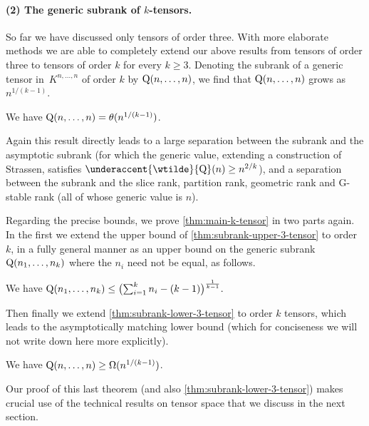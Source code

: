 \documentclass[10pt,a4paper]{article}
\theoremstyle{definition}
\theoremstyle{remark}
\newcommand{\gensubrank}{{\rm Q}}
\DeclareMathOperator{\asympsubrank}{\underaccent{\wtilde}{Q}}
\begin{document}
%

%

%
%
%
%
%
%
%
%
%
%

\paragraph{(2) The generic subrank of $k$-tensors.}
So far we have discussed only tensors of order three. With more elaborate methods we are able to completely extend our above results from tensors of order three to tensors of order $k$ for every $k \geq 3$. Denoting the subrank of a generic tensor in~$K^{n,\ldots, n}$ of order $k$ by $\gensubrank(n,\ldots,n)$, we find that $\gensubrank(n,\ldots,n)$ grows as~$n^{1/(k-1)}$.


\begin{theorem}\label{thm:main-k-tensor}
We have $\gensubrank(n,\ldots,n) = \theta(n^{1/(k-1)})$.
\end{theorem}


Again this result directly leads to a large separation between the subrank and the asymptotic subrank (for which the generic value, extending a construction of Strassen, satisfies $\asympsubrank(n) \geq n^{2/k}$), and a separation between the subrank and the slice rank, partition rank, geometric rank and G-stable rank (all of whose generic value is $n$).

Regarding the precise bounds, we prove \autoref{thm:main-k-tensor} in two parts again. 
In the first we extend the upper bound of \autoref{thm:subrank-upper-3-tensor}
to order $k$, in a fully general manner as an upper bound on the generic subrank $\gensubrank(n_1,\ldots,n_k)$ where the $n_i$ need not be equal, as follows.

\begin{theorem} \label{thm:subrank-upper-k-tensor}
%
We have
$
\gensubrank(n_1,\ldots,n_k) \leq \bigl(\sum_{i=1}^k n_i - (k-1)\bigr)^{\frac{1}{k-1}}.
$
\end{theorem}

Then finally we extend \autoref{thm:subrank-lower-3-tensor} to order $k$ tensors, which leads to the asymptotically matching lower bound (which for conciseness we will not write down here more explicitly).

\begin{theorem}\label{thm:subrank-lower-k-tensor}
We have $\gensubrank(n,\ldots,n) \geq \Omega(n^{1/(k-1)})$.
\end{theorem}

Our proof of this last theorem (and also \autoref{thm:subrank-lower-3-tensor}) makes crucial use of the  technical results on tensor space that we discuss in the next section.
\end{document}
